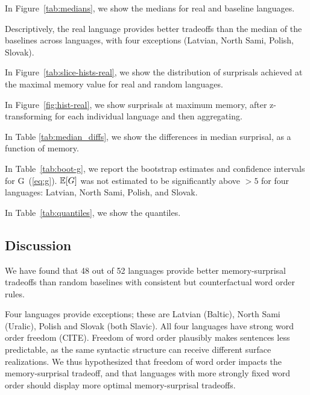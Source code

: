 
In Figure~\ref{tab:medians}, we show the medians for real and baseline languages.

Descriptively, the real language provides better tradeoffs than the median of the baselines across languages, with four exceptions (Latvian, North Sami, Polish, Slovak).

In Figure~\ref{tab:slice-hists-real}, we show the distribution of surprisals achieved at the maximal memory value for real and random languages.

In Figure~\ref{fig:hist-real}, we show surprisals at maximum memory, after z-transforming for each individual language and then aggregating.

In Table \ref{tab:median_diffs}, we show the differences in median surprisal, as a function of memory.


In Table~\ref{tab:boot-g}, we report the bootstrap estimates and confidence intervals for G~(\ref{eq:g}).
$\mathbb{E}[G]$ was not estimated to be significantly above $>5$ for four languages: Latvian, North Sami, Polish, and Slovak.


In Table~\ref{tab:quantiles}, we show the quantiles.





\subsection{Discussion}

We have found that 48 out of 52 languages provide better memory-surprisal tradeoffs than random baselines with consistent but counterfactual word order rules.

Four languages provide exceptions; these are Latvian (Baltic), North Sami (Uralic), Polish and Slovak (both Slavic).
All four languages have strong word order freedom (CITE).
Freedom of word order plausibly makes sentences less predictable, as the same syntactic structure can receive different surface realizations.
We thus hypothesized that freedom of word order impacts the memory-surprisal tradeoff, and that languages with more strongly fixed word order should display more optimal memory-surprisal tradeoffs.

